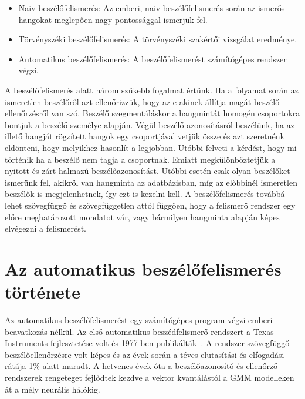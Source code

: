\begin{itemize}
	\item Naiv beszélőfelismerés: Az emberi, naiv beszélőfelismerés során az ismerős hangokat meglepően nagy pontossággal ismerjük fel.
	\item Törvényszéki beszélőfelismerés: A törvényszéki szakértői vizsgálat eredménye.
	\item Automatikus beszélőfelismerés: A beszélőfelismerést számítógépes rendszer végzi.
\end{itemize}

A beszélőfelismerés alatt három szűkebb fogalmat értünk. Ha a folyamat során az ismeretlen beszélőről azt ellenőrizzük, hogy az-e akinek állítja magát beszélő ellenőrzésről van szó. Beszélő szegmentáláskor a hangmintát homogén csoportokra bontjuk a beszélő személye alapján. Végül beszélő azonosításról beszélünk, ha az illető hangját rögzített hangok egy csoportjával vetjük össze és azt szeretnénk eldönteni, hogy melyikhez hasonlít a legjobban. Utóbbi felveti a kérdést, hogy mi történik ha a beszélő nem tagja a csoportnak.
\newline
\newline
Emiatt megkülönböztetjük a nyitott és zárt halmazú beszélőazonosítást. Utóbbi esetén csak olyan beszélőket ismerünk fel, akikről van hangminta az adatbázisban, míg az előbbinél ismeretlen beszélők is megjelenhetnek, így ezt is kezelni kell.
\newline
\newline
A beszélőfelismerés továbbá lehet szövegfüggő és szövegfüggetlen attól függően, hogy a felismerő rendszer egy előre meghatározott mondatot vár, vagy bármilyen hangminta alapján képes elvégezni a felismerést.

\section{Az automatikus beszélőfelismerés története}

Az automatikus beszélőfelismerést egy számítógépes program végzi emberi beavatkozás nélkül. Az első automatikus beszédfelismerő rendszert a Texas Instruments fejlesztetése volt és 1977-ben publikálták~\cite{Shaver2016ABR}. A rendszer szövegfüggő beszélőellenőrzésre volt képes és az évek során a téves elutasítási és elfogadási rátája 1$\%$ alatt maradt. A hetvenes évek óta a beszélőazonosító és ellenőrző rendszerek rengeteget fejlődtek kezdve a vektor kvantálástól a GMM modelleken át a mély neurális hálókig.

